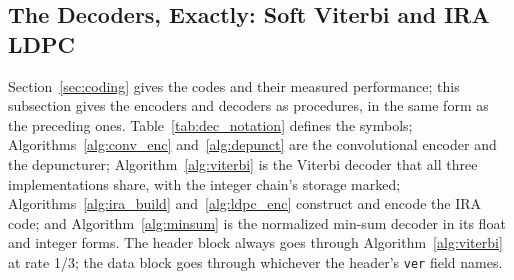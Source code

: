\subsection{The Decoders, Exactly: Soft Viterbi and IRA LDPC}
\label{sec:dec_exact}

Section~\ref{sec:coding} gives the codes and their measured
performance; this subsection gives the encoders and decoders as
procedures, in the same form as the preceding ones.
Table~\ref{tab:dec_notation} defines the symbols;
Algorithms~\ref{alg:conv_enc} and~\ref{alg:depunct} are the
convolutional encoder and the depuncturer; Algorithm~\ref{alg:viterbi}
is the Viterbi decoder that all three implementations share, with the
integer chain's storage marked; Algorithms~\ref{alg:ira_build}
and~\ref{alg:ldpc_enc} construct and encode the IRA code; and
Algorithm~\ref{alg:minsum} is the normalized min-sum decoder in its
float and integer forms.  The header block always goes through
Algorithm~\ref{alg:viterbi} at rate 1/3; the data block goes through
whichever the header's \texttt{ver} field names.

